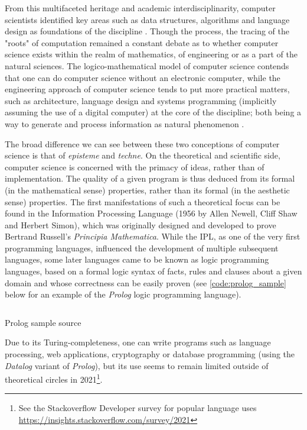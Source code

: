 From this multifaceted heritage and academic interdisciplinarity, computer scientists identified key areas such as data structures, algorithms and language design as foundations of the discipline \citep{wirth_algorithms_1976}. Though the process, the tracing of the "roots" of computation remained a constant debate as to whether computer science exists within the realm of mathematics, of engineering or as a part of the natural sciences. The logico-mathematical model of computer science contends that one can do computer science without an electronic computer, while the engineering approach of computer science tends to put more practical matters, such as architecture, language design and systems programming (implicitly assuming the use of a digital computer) at the core of the discipline; both being a way to generate and process information as natural phenomenon \citep{tedre_development_2006}.

The broad difference we can see between these two conceptions of computer science is that of \emph{episteme} and \emph{techne}. On the theoretical and scientific side, computer science is concerned with the primacy of ideas, rather than of implementation. The quality of a given program is thus deduced from its formal (in the mathematical sense) properties, rather than its formal (in the aesthetic sense) properties. The first manifestations of such a theoretical focus can be found in the Information Processing Language (1956 by Allen Newell, Cliff Shaw and Herbert Simon), which was originally designed and developed to prove Bertrand Russell's \emph{Principia Mathematica}. While the IPL, as one of the very first programming languages, influenced the development of multiple subsequent languages, some later languages came to be known as logic programming languages, based on a formal logic syntax of facts, rules and clauses about a given domain and whose correctness can be easily proven (see \ref{code:prolog_sample} below for an example of the \emph{Prolog} logic programming language).

\begin{listing}
  \inputminted{prolog}{./corpus/inductive.pl}
  \caption{Prolog sample source}
  \label{code:prolog_sample}
\end{listing}

Due to its Turing-completeness, one can write programs such as language processing, web applications, cryptography or database programming (using the \emph{Datalog} variant of \emph{Prolog}), but its use seems to remain limited outside of theoretical circles in 2021\footnote{See the Stackoverflow Developer survey for popular language uses \url{https://insights.stackoverflow.com/survey/2021}}.

